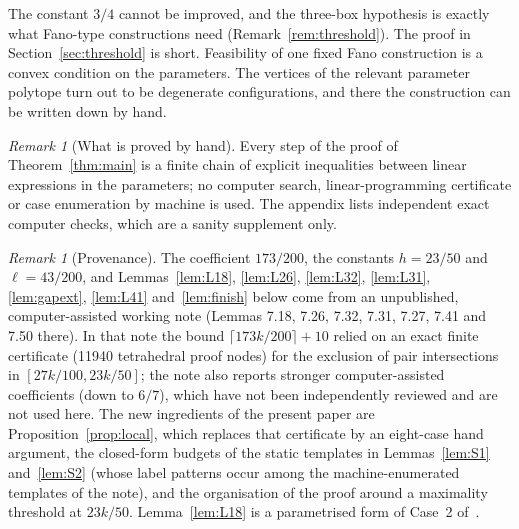 \documentclass[11pt]{amsart}
\theoremstyle{definition}
\theoremstyle{remark}
\newtheorem{remark}[theorem]{Remark}
\newcommand{\ceil}[1]{\lceil #1\rceil}
\begin{document}
The constant $3/4$ cannot be improved, and the three-box hypothesis is exactly what Fano-type constructions need (Remark~\ref{rem:threshold}). The proof in Section~\ref{sec:threshold} is short. Feasibility of one fixed Fano construction is a convex condition on the parameters. The vertices of the relevant parameter polytope turn out to be degenerate configurations, and there the construction can be written down by hand.

\begin{remark}[What is proved by hand]
Every step of the proof of Theorem~\ref{thm:main} is a finite chain of explicit inequalities between linear expressions in the parameters; no computer search, linear-programming certificate or case enumeration by machine is used. The appendix lists independent exact computer checks, which are a sanity supplement only.
\end{remark}

\begin{remark}[Provenance]\label{rem:prov}
The coefficient $173/200$, the constants $h=23/50$ and $\ell=43/200$, and Lemmas~\ref{lem:L18}, \ref{lem:L26}, \ref{lem:L32}, \ref{lem:L31}, \ref{lem:gapext}, \ref{lem:L41} and~\ref{lem:finish} below come from an unpublished, computer-assisted working note (Lemmas 7.18, 7.26, 7.32, 7.31, 7.27, 7.41 and 7.50 there). In that note the bound $\ceil{173k/200}+10$ relied on an exact finite certificate (11940 tetrahedral proof nodes) for the exclusion of pair intersections in $[27k/100,23k/50]$; the note also reports stronger computer-assisted coefficients (down to $6/7$), which have not been independently reviewed and are not used here. The new ingredients of the present paper are Proposition~\ref{prop:local}, which replaces that certificate by an eight-case hand argument, the closed-form budgets of the static templates in Lemmas~\ref{lem:S1} and~\ref{lem:S2} (whose label patterns occur among the machine-enumerated templates of the note), and the organisation of the proof around a maximality threshold at $23k/50$. Lemma~\ref{lem:L18} is a parametrised form of Case~2 of~\cite[Lemma~1]{FKW}.
\end{remark}
\end{document}
